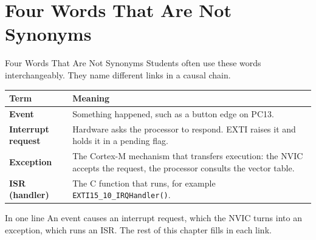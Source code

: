 \documentclass[9pt,aspectratio=169,xcolor=table]{beamer}
\newcommand{\striped}{\rowcolors{1}{white}{stripe}}
\begin{document}
\section{Four Words That Are Not Synonyms}
\begin{frame}{Four Words That Are Not Synonyms}
    \leavevmode
    {\small Students often use these words interchangeably. They name
    different links in a causal chain.}

    \vspace{2mm}
    \begin{center}
    {\small
    \striped
    \begin{tabular}{@{}l R{.68\textwidth}@{}}
        \toprule
        \textbf{Term} & \textbf{Meaning} \\
        \midrule
        \textbf{Event}             & Something happened, such as a button edge on PC13. \\
        \textbf{Interrupt request} & Hardware asks the processor to respond. EXTI raises it and holds it in a pending flag. \\
        \textbf{Exception}         & The Cortex-M mechanism that transfers execution: the NVIC accepts the request, the processor consults the vector table. \\
        \textbf{ISR (handler)}     & The C function that runs, for example \texttt{EXTI15\_10\_IRQHandler()}. \\
        \bottomrule
    \end{tabular}}
    \end{center}

    \vspace{3mm}
    \begin{block}{In one line}
        An \alert{event} causes an \alert{interrupt request}, which the
        NVIC turns into an \alert{exception}, which runs an \alert{ISR}.
        The rest of this chapter fills in each link.
    \end{block}
\end{frame}

\end{document}
